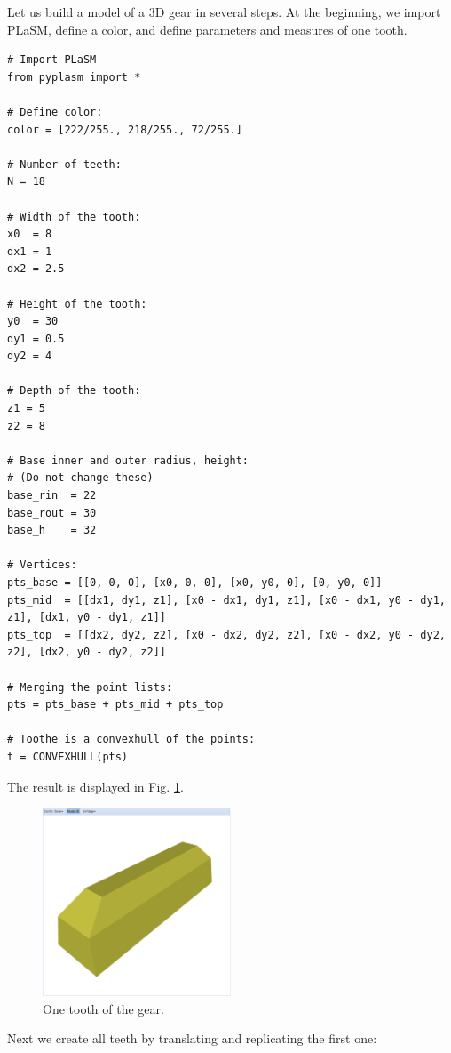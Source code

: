 \documentclass{article}
\begin{document}
Let us build a model of a 3D gear in several steps.
At the beginning, we import PLaSM, define a color, and define parameters
and measures of one tooth.
{\small
\begin{verbatim}
# Import PLaSM
from pyplasm import *

# Define color:
color = [222/255., 218/255., 72/255.]  

# Number of teeth:
N = 18

# Width of the tooth:
x0  = 8
dx1 = 1
dx2 = 2.5

# Height of the tooth:
y0  = 30
dy1 = 0.5
dy2 = 4

# Depth of the tooth:
z1 = 5
z2 = 8

# Base inner and outer radius, height:
# (Do not change these)
base_rin  = 22
base_rout = 30
base_h    = 32

# Vertices:
pts_base = [[0, 0, 0], [x0, 0, 0], [x0, y0, 0], [0, y0, 0]]
pts_mid  = [[dx1, dy1, z1], [x0 - dx1, dy1, z1], [x0 - dx1, y0 - dy1, z1], [dx1, y0 - dy1, z1]]
pts_top  = [[dx2, dy2, z2], [x0 - dx2, dy2, z2], [x0 - dx2, y0 - dy2, z2], [dx2, y0 - dy2, z2]]

# Merging the point lists:
pts = pts_base + pts_mid + pts_top

# Toothe is a convexhull of the points:
t = CONVEXHULL(pts)
\end{verbatim}
}
\noindent
The result is displayed in Fig. \ref{fig:gear-1}.
\newpage

\begin{figure}[!ht]
\begin{center}
\includegraphics[width=0.5\textwidth]{img/gear-1.png}
\end{center}
\vspace{-2mm}
\caption{One tooth of the gear.}
\label{fig:gear-1}
\end{figure}
\noindent
Next we create all teeth by translating and replicating the first one:
\end{document}
